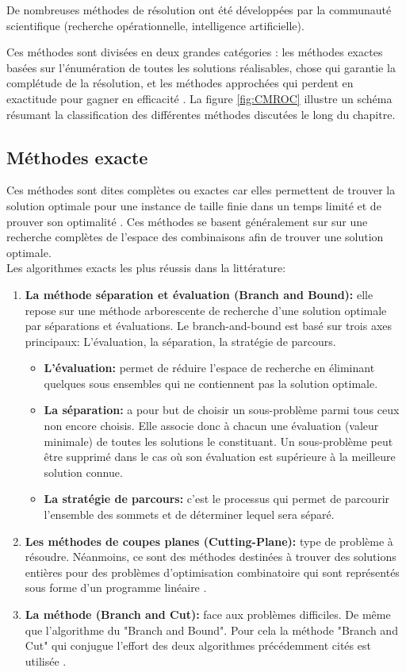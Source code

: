 De nombreuses méthodes de résolution ont été développées par la communauté scientifique (recherche opérationnelle, intelligence artificielle).

Ces méthodes sont divisées en deux grandes catégories : les méthodes exactes basées sur l’énumération de toutes les solutions réalisables, chose qui garantie la complétude de la résolution, et les méthodes approchées qui perdent en exactitude pour gagner en efficacité \cite{park2007dominating} . La figure \ref{fig:CMROC} illustre un schéma résumant la classification des différentes méthodes discutées le long du chapitre.

\subsection{Méthodes exacte}
Ces méthodes sont dites complètes ou exactes car elles permettent de trouver la solution optimale pour une instance de taille finie dans un temps limité et de prouver son optimalité \cite{puchinger2005combining} . Ces méthodes se basent généralement sur sur une recherche complètes de l’espace des combinaisons afin de trouver une solution optimale.\\
Les algorithmes exacts les plus réussis dans la littérature: 


\begin{enumerate}[label=\alph*)]
	\item \textbf{La méthode séparation et évaluation (Branch and Bound):} elle repose sur une méthode arborescente de recherche d’une solution optimale par séparations et évaluations. Le branch-and-bound est basé sur trois axes principaux: L’évaluation, la séparation, la stratégie de parcours.
	\begin{itemize}
		\item \textbf{L’évaluation: } permet de réduire l’espace de recherche en éliminant quelques sous ensembles qui ne contiennent pas la solution optimale.
		\item \textbf{La séparation: } a pour but de choisir un sous-problème parmi tous ceux non encore choisis. Elle associe donc à chacun une évaluation (valeur minimale) de toutes les solutions le constituant. Un sous-problème peut être supprimé dans le cas où son évaluation est supérieure à la meilleure solution connue.
		\item \textbf{La stratégie de parcours: } c’est le processus qui permet de parcourir l’ensemble des sommets et de déterminer lequel sera séparé.
	\end{itemize}
	\item \textbf{Les méthodes de coupes planes (Cutting-Plane): }type de problème à résoudre. Néanmoins, ce sont des méthodes destinées à trouver des solutions entières pour des problèmes d’optimisation combinatoire qui sont représentés sous forme d’un programme linéaire \cite{schrijver1986theory} .
	\item \textbf{La méthode (Branch and Cut): }face aux problèmes difficiles. De même que l’algorithme du "Branch and Bound". Pour cela la méthode "Branch and Cut" qui conjugue l’effort des deux algorithmes précédemment cités est utilisée \cite{padberg1991branch,padberg1987optimization} .
\end{enumerate}

